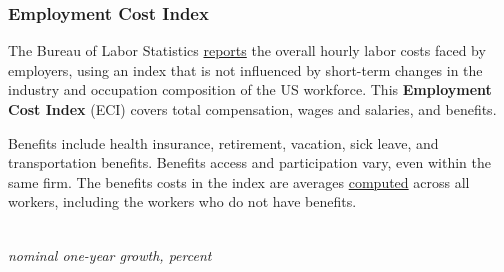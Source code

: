 \subsubsection*{Employment Cost Index}
\begin{minipage}{0.76\textwidth}   
\small The Bureau of Labor Statistics \href{https://www.bls.gov/news.release/eci.nr0.htm}{reports} the overall hourly labor costs faced by employers, using an index that is not influenced by short-term changes in the industry and occupation composition of the US workforce. This \textbf{Employment Cost Index} (ECI) covers total compensation, wages and salaries, and benefits.

Benefits include health insurance, retirement, vacation, sick leave, and transportation benefits. Benefits access and participation vary, even within the same firm. The benefits costs in the index are averages \href{https://www.bls.gov/opub/mlr/cwc/benefit-cost-concepts-and-the-limitations-of-ecec-measurement.pdf}{computed} across all workers, including the workers who do not have benefits. 
\end{minipage}

\begin{minipage}{0.40\textwidth}
\\
\footnotesize{\textit{nominal one-year growth, percent}}\\
\edef\custticks{{2001-01-01}, \afticks}
\end{minipage} \hspace{5mm} \begin{minipage}{0.32\textwidth}
\small 
\end{minipage}
\vspace{2mm}

